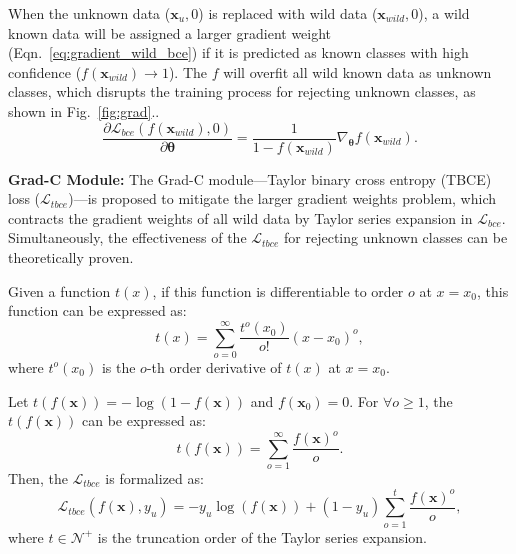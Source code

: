 When the unknown data ($\boldsymbol{x}_{u},0$) is replaced with wild data ($\boldsymbol{x}_{wild},0$), a wild known data will be assigned a larger gradient weight (Eqn.~\ref{eq:gradient_wild_bce}) if it is predicted as known classes with high confidence ($f(\boldsymbol{x}_{wild}) \rightarrow 1$). The $f$ will overfit all wild known data as unknown classes, which disrupts the training process for rejecting unknown classes, as shown in Fig.~\ref{fig:grad}..
\begin{equation}
    \frac{\partial \mathcal{L}_{bce}(f(\boldsymbol{x}_{wild}),0)}{\partial \boldsymbol{\theta}}={\frac{1}{1-f(\boldsymbol{x}_{wild})}}\nabla_{\boldsymbol{\theta}}f(\boldsymbol{x}_{wild}).
\label{eq:gradient_wild_bce}
\end{equation}

\noindent \textbf{Grad-C Module:}
The Grad-C module---Taylor binary cross entropy (TBCE) loss ($\mathcal{L}_{tbce}$)---is proposed to mitigate the larger gradient weights problem, which contracts the gradient weights of all wild data by Taylor series expansion in $\mathcal{L}_{bce}$. Simultaneously, the effectiveness of the $\mathcal{L}_{tbce}$ for rejecting unknown classes can be theoretically proven.

Given a function $t(x)$, if this function is differentiable to order $o$ at $x=x_0$, this function can be expressed as:
\begin{equation}\nonumber
    t(x)=\sum_{o=0}^{\infty}\frac{t^{o}(x_0)}{o!}(x-x_0)^o,
\end{equation}
where $t^{o}(x_0)$ is the $o$-th order derivative of $t(x)$ at $x=x_0$.

Let $t(f(\boldsymbol{x}))=-\log(1-f(\boldsymbol{x}))$ and $f(\boldsymbol{x}_{0})=0$. For $\forall o \geq 1$, the $t(f(\boldsymbol{x}))$ can be expressed as:
\begin{equation}\nonumber
    t(f(\boldsymbol{x}))=\sum_{o=1}^{\infty}\frac{f(\boldsymbol{x})^o}{o}.
\end{equation}
Then, the $\mathcal{L}_{tbce}$ is formalized as:
\begin{equation}
    \mathcal{L}_{tbce}(f(\boldsymbol{x}),y_{u})=-y_{u}\log(f(\boldsymbol{x}))+(1-y_{u})\sum_{o=1}^{t}\frac{{f(\boldsymbol{x})}^{o}}{o},
    \label{eq:taylot_binary_cross_entropy}
\end{equation}
where $t \in \mathcal{N}^+$ is the truncation order of the Taylor series expansion.

